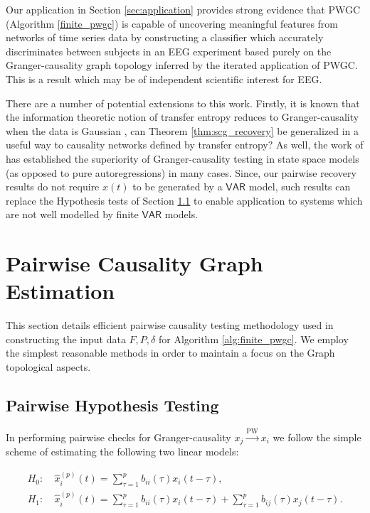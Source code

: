 \documentclass[12pt]{article}
\def\pwgc{\overset{\text{PW}}{\rightarrow}}  %
\def\VAR{\mathsf{VAR}}  %
\begin{document}
Our application in Section \ref{sec:application} provides strong
evidence that PWGC (Algorithm \ref{finite_pwgc}) is capable of
uncovering meaningful features from networks of time series data by
constructing a classifier which accurately discriminates between
subjects in an EEG experiment based purely on the Granger-causality
graph topology inferred by the iterated application of PWGC.  This is
a result which may be of independent scientific interest for EEG.

There are a number of potential extensions to this work.  Firstly, it
is known that the information theoretic notion of transfer entropy
reduces to Granger-causality when the data is Gaussian
\cite{barnett2009granger}, can Theorem \ref{thm:scg_recovery} be
generalized in a useful way to causality networks defined by transfer
entropy?  As well, the work of \cite{barnett2015granger} has
established the superiority of Granger-causality testing in state
space models (as opposed to pure autoregressions) in many cases.
Since, our pairwise recovery results do not require $x(t)$ to be
generated by a $\VAR$ model, such results can replace the Hypothesis
tests of Section \ref{sec:pairwise_hypothesis_testing} to enable
application to systems which are not well modelled by finite $\VAR$
models.

\clearpage
\printbibliography
\clearpage
\appendix

\section{Pairwise Causality Graph Estimation}
This section details efficient pairwise causality testing methodology
used in constructing the input data $F, P, \delta$ for Algorithm
\ref{alg:finite_pwgc}.  We employ the simplest reasonable methods in
order to maintain a focus on the Graph topological aspects.

\subsection{Pairwise Hypothesis Testing}
\label{sec:pairwise_hypothesis_testing}
In performing pairwise checks for Granger-causality $x_j \pwgc x_i$ we
follow the simple scheme of estimating the following two linear models:

\begin{align}
  H_0:&\ \widehat{x}_i^{(p)}(t) = \sum_{\tau = 1}^{p} b_{ii}(\tau)x_i(t - \tau),\\
  H_1:&\ \widehat{x}_i^{(p)}(t) = \sum_{\tau = 1}^{p} b_{ii}(\tau)x_i(t - \tau) + \sum_{\tau = 1}^pb_{ij}(\tau)x_j(t - \tau).
\end{align}
\end{document}
